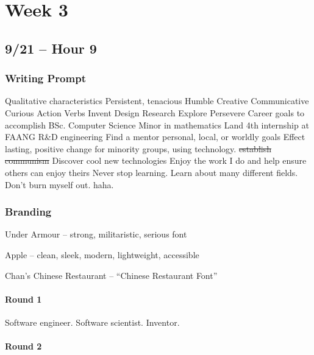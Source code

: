 \chapter{Week 3}

\section{9/21 -- Hour 9}

\subsection{Writing Prompt}

\begin{outline}
     Qualitative characteristics
        \2 Persistent, tenacious
        \2 Humble
        \2 Creative
        \2 Communicative
        \2 Curious
     Action Verbs
        \2 Invent
        \2 Design
        \2 Research
        \2 Explore
        \2 Persevere
     Career goals to accomplish
        \2 BSc. Computer Science
        \2 Minor in mathematics
        \2 Land 4th internship at FAANG
        \2 R\&D engineering
        \2 Find a mentor
     personal, local, or worldly goals
        \2 Effect lasting, positive change for minority groups, using technology. \st{establish communism}
        \2 Discover cool new technologies
        \2 Enjoy the work I do and help ensure others can enjoy theirs
        \2 Never stop learning. Learn about many different fields.
        \2 Don't burn myself out. haha.
\end{outline}

\subsection{Branding}

Under Armour -- strong, militaristic, serious font

Apple -- clean, sleek, modern, lightweight, accessible

Chan's Chinese Restaurant -- ``Chinese Restaurant Font''

\subsubsection{Round 1}

Software engineer. Software scientist. Inventor. 

\subsubsection{Round 2}

